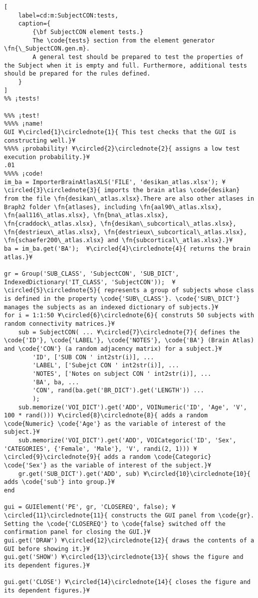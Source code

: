 \documentclass{tufte-handout}
\begin{document}
\begin{lstlisting}[
	label=cd:m:SubjectCON:tests,
	caption={
		{\bf SubjectCON element tests.}
		The \code{tests} section from the element generator \fn{\_SubjectCON.gen.m}.
		A general test should be prepared to test the properties of the Subject when it is empty and full. Furthermore, additional tests should be prepared for the rules defined.
	}
]			
%% ¡tests!

%%% ¡test!
%%%% ¡name!
GUI ¥\circled{1}\circlednote{1}{ This test checks that the GUI is constructing well.}¥
%%%% ¡probability! ¥\circled{2}\circlednote{2}{ assigns a low test execution probability.}¥
.01
%%%% ¡code!
im_ba = ImporterBrainAtlasXLS('FILE', 'desikan_atlas.xlsx'); ¥\circled{3}\circlednote{3}{ imports the brain atlas \code{desikan} from the file \fn{desikan\_atlas.xlsx}.There are also other atlases in Braph2 folder \fn{atlases}, including \fn{aal90\_atlas.xlsx}, \fn{aal116\_atlas.xlsx}, \fn{bna\_atlas.xlsx}, \fn{craddock\_atlas.xlsx}, \fn{desikan\_subcortical\_atlas.xlsx}, \fn{destrieux\_atlas.xlsx}, \fn{destrieux\_subcortical\_atlas.xlsx},  \fn{schaefer200\_atlas.xlsx} and \fn{subcortical\_atlas.xlsx}.}¥
ba = im_ba.get('BA');  ¥\circled{4}\circlednote{4}{ returns the brain atlas.}¥

gr = Group('SUB_CLASS', 'SubjectCON', 'SUB_DICT', IndexedDictionary('IT_CLASS', 'SubjectCON'));  ¥\circled{5}\circlednote{5}{ represents a group of subjects whose class is defined in the property \code{'SUB\_CLASS'}. \code{'SUB\_DICT'} manages the subjects as an indexed dictionary of subjects.}¥
for i = 1:1:50 ¥\circled{6}\circlednote{6}{ construts 50 subjects with random connectivity matrices.}¥
    sub = SubjectCON( ... ¥\circled{7}\circlednote{7}{ defines the \code{'ID'}, \code{'LABEL'}, \code{'NOTES'}, \code{'BA'} (Brain Atlas) and \code{'CON'} (a random adjacency matrix) for a subject.}¥
        'ID', ['SUB CON ' int2str(i)], ...
        'LABEL', ['Subejct CON ' int2str(i)], ...
        'NOTES', ['Notes on subject CON ' int2str(i)], ...
        'BA', ba, ...
        'CON', rand(ba.get('BR_DICT').get('LENGTH')) ...
        );
    sub.memorize('VOI_DICT').get('ADD', VOINumeric('ID', 'Age', 'V', 100 * rand())) ¥\circled{8}\circlednote{8}{ adds a random \code{Numeric} \code{'Age'} as the variable of interest of the subject.}¥
    sub.memorize('VOI_DICT').get('ADD', VOICategoric('ID', 'Sex', 'CATEGORIES', {'Female', 'Male'}, 'V', randi(2, 1))) ¥\circled{9}\circlednote{9}{ adds a random \code{Categoric} \code{'Sex'} as the variable of interest of the subject.}¥
    gr.get('SUB_DICT').get('ADD', sub) ¥\circled{10}\circlednote{10}{ adds \code{'sub'} into group.}¥
end

gui = GUIElement('PE', gr, 'CLOSEREQ', false); ¥\circled{11}\circlednote{11}{ constructs the GUI panel from \code{gr}. Setting the \code{'CLOSEREQ'} to \code{false} switched off the confirmation panel for closing the GUI.}¥
gui.get('DRAW') ¥\circled{12}\circlednote{12}{ draws the contents of a GUI before showing it.}¥
gui.get('SHOW') ¥\circled{13}\circlednote{13}{ shows the figure and its dependent figures.}¥

gui.get('CLOSE') ¥\circled{14}\circlednote{14}{ closes the figure and its dependent figures.}¥
\end{lstlisting}
\end{document}
